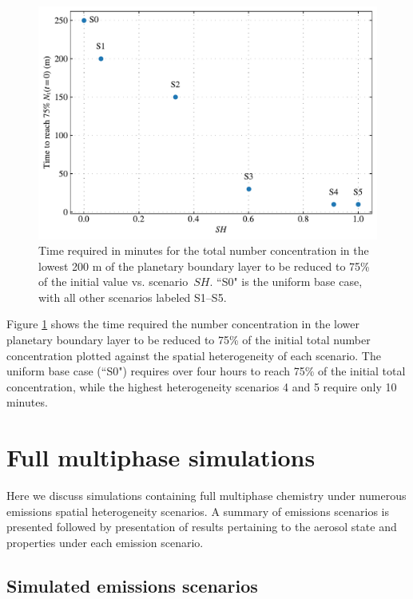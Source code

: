\begin{figure}[!t]
  \centering
    \includegraphics[width=.8\textwidth]{figures/chapter5/ideal-coag/TimeTo75pcnt_vs_SH.pdf}
    \caption{Time required in minutes for the total number concentration in the lowest 200 m of the planetary boundary layer to be reduced to 75\% of the initial value vs. scenario~$SH$. ``S0" is the uniform base case, with all other scenarios labeled S1--S5.}
    \label{fig:numconc-timescales-to-75pcent}
\end{figure}

Figure \ref{fig:numconc-timescales-to-75pcent} shows the time required the number concentration in the lower planetary boundary layer to be reduced to 75\% of the initial total number concentration plotted against the spatial heterogeneity of each scenario. The uniform base case (``S0") requires over four hours to reach 75\% of the initial total concentration, while the highest heterogeneity scenarios 4 and 5 require only 10 minutes.

\section{Full multiphase simulations}

Here we discuss simulations containing full multiphase chemistry under numerous emissions spatial heterogeneity scenarios. A summary of emissions scenarios is presented followed by presentation of results pertaining to the aerosol state and properties under each emission scenario. 

\subsection{Simulated emissions scenarios}


